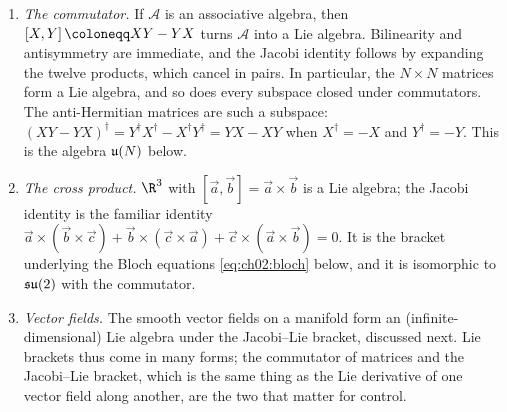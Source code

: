 \documentclass[handoutsbeamer.tex]{subfiles}
\begin{document}
\begin{frame}
{\begin{enumerate}
    \item \emph{The commutator.} If $\mathcal A$ is an associative algebra, then $\comm{X}{Y}\coloneqq XY-YX$ turns $\mathcal A$ into a Lie algebra. Bilinearity and antisymmetry are immediate, and the Jacobi identity follows by expanding the twelve products, which cancel in pairs. In particular, the $N\times N$ matrices form a Lie algebra, and so does every subspace closed under commutators. The anti-Hermitian matrices are such a subspace: $(XY-YX)^\dagger=Y^\dagger X^\dagger-X^\dagger Y^\dagger=YX-XY$ when $X^\dagger=-X$ and $Y^\dagger=-Y$. This is the algebra $\lieu[N]$ below.
    \item \emph{The cross product.} $\R^3$ with $[\vec a,\vec b]=\vec a\times\vec b$ is a Lie algebra; the Jacobi identity is the familiar identity $\vec a\times(\vec b\times\vec c)+\vec b\times(\vec c\times\vec a)+\vec c\times(\vec a\times\vec b)=0$. It is the bracket underlying the Bloch equations \eqref{eq:ch02:bloch} below, and it is isomorphic to $\liesu[2]$ with the commutator.
    \item \emph{Vector fields.} The smooth vector fields on a manifold form an (infinite-dimensional) Lie algebra under the Jacobi--Lie bracket, discussed next. Lie brackets thus come in many forms; the commutator of matrices and the Jacobi--Lie bracket, which is the same thing as the Lie derivative of one vector field along another, are the two that matter for control.
\end{enumerate}}
\end{frame}
\end{document}
